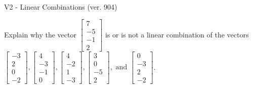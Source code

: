 \begin{exercise}
  \begin{exerciseTitle}V2 - Linear Combinations (ver. 904)\end{exerciseTitle}
  \begin{exerciseStatement}
    Explain why the vector \(\left[\begin{array}{c}
7 \\
-5 \\
-1 \\
2
\end{array}\right]\)  is or is not a linear 
	combination of the vectors \(\left[\begin{array}{c}
-3 \\
2 \\
0 \\
-2
\end{array}\right] , \left[\begin{array}{c}
4 \\
-3 \\
-1 \\
0
\end{array}\right] , \left[\begin{array}{c}
4 \\
-2 \\
1 \\
-3
\end{array}\right] , \left[\begin{array}{c}
3 \\
0 \\
-5 \\
2
\end{array}\right] , \text{ and } \left[\begin{array}{c}
0 \\
-3 \\
2 \\
-2
\end{array}\right]\).
	



\end{exerciseStatement}
\end{exercise}
